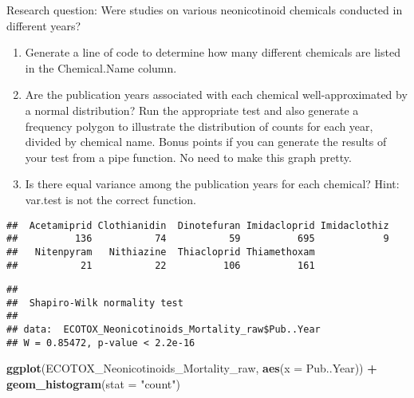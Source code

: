 \documentclass[]{article}
\newenvironment{Shaded}{\begin{snugshade}}{\end{snugshade}}
\newcommand{\KeywordTok}[1]{\textcolor[rgb]{0.13,0.29,0.53}{\textbf{#1}}}
\newcommand{\DataTypeTok}[1]{\textcolor[rgb]{0.13,0.29,0.53}{#1}}
\newcommand{\StringTok}[1]{\textcolor[rgb]{0.31,0.60,0.02}{#1}}
\newcommand{\CommentTok}[1]{\textcolor[rgb]{0.56,0.35,0.01}{\textit{#1}}}
\newcommand{\OperatorTok}[1]{\textcolor[rgb]{0.81,0.36,0.00}{\textbf{#1}}}
\newcommand{\NormalTok}[1]{#1}
\begin{document}
Research question: Were studies on various neonicotinoid chemicals
conducted in different years?

\begin{enumerate}
\def\labelenumi{\arabic{enumi}.}
\setcounter{enumi}{2}
\item
  Generate a line of code to determine how many different chemicals are
  listed in the Chemical.Name column.
\item
  Are the publication years associated with each chemical
  well-approximated by a normal distribution? Run the appropriate test
  and also generate a frequency polygon to illustrate the distribution
  of counts for each year, divided by chemical name. Bonus points if you
  can generate the results of your test from a pipe function. No need to
  make this graph pretty.
\item
  Is there equal variance among the publication years for each chemical?
  Hint: var.test is not the correct function.
\end{enumerate}

\begin{Shaded}
\end{Shaded}

\begin{verbatim}
##  Acetamiprid Clothianidin  Dinotefuran Imidacloprid Imidaclothiz 
##          136           74           59          695            9 
##   Nitenpyram   Nithiazine  Thiacloprid Thiamethoxam 
##           21           22          106          161
\end{verbatim}

\begin{Shaded}
\end{Shaded}

\begin{verbatim}
## 
##  Shapiro-Wilk normality test
## 
## data:  ECOTOX_Neonicotinoids_Mortality_raw$Pub..Year
## W = 0.85472, p-value < 2.2e-16
\end{verbatim}

\begin{Shaded}
\begin{Highlighting}[]
\KeywordTok{ggplot}\NormalTok{(ECOTOX_Neonicotinoids_Mortality_raw, }\KeywordTok{aes}\NormalTok{(}\DataTypeTok{x =}\NormalTok{ Pub..Year)) }\OperatorTok{+}
\StringTok{  }\KeywordTok{geom_histogram}\NormalTok{(}\DataTypeTok{stat =} \StringTok{"count"}\NormalTok{)}
\end{Highlighting}
\end{Shaded}
\end{document}
